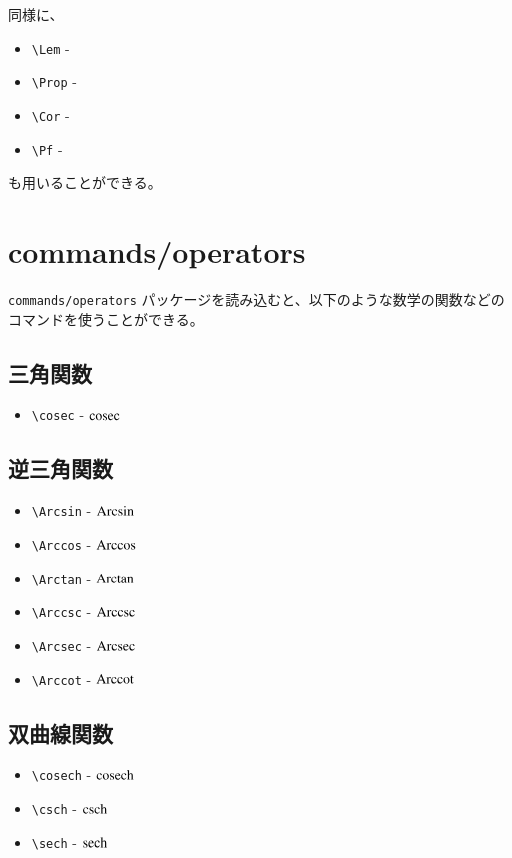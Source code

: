 \documentclass[oneside,10pt,a4paper]{jsarticle}
\begin{document}
  同様に、
  \begin{itemize}
    \item \verb|\Lem| - \Lem
    \item \verb|\Prop| - \Prop
    \item \verb|\Cor| - \Cor
    \item \verb|\Pf| - \Pf
  \end{itemize}
  も用いることができる。

  \newpage

  \section{commands/operators}

  \verb|commands/operators| パッケージを読み込むと、以下のような数学の関数などのコマンドを使うことができる。

  \subsection{三角関数}

  \begin{itemize}
    \item \verb|\cosec| - $ \operatorname{cosec} $
  \end{itemize}

  \subsection{逆三角関数}

  \begin{itemize}
    \item \verb|\Arcsin| - $ \operatorname{Arcsin} $
    \item \verb|\Arccos| - $ \operatorname{Arccos} $
    \item \verb|\Arctan| - $ \operatorname{Arctan} $
    \item \verb|\Arccsc| - $ \operatorname{Arccsc} $
    \item \verb|\Arcsec| - $ \operatorname{Arcsec} $
    \item \verb|\Arccot| - $ \operatorname{Arccot} $
  \end{itemize}

  \subsection{双曲線関数}

  \begin{itemize}
    \item \verb|\cosech| - $ \operatorname{cosech} $
    \item \verb|\csch| - $ \operatorname{csch} $
    \item \verb|\sech| - $ \operatorname{sech} $
  \end{itemize}
\end{document}
